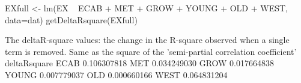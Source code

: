 \begin{Schunk}
\begin{Sinput}
 EXfull <- lm(EX ~ ECAB + MET + GROW + YOUNG + OLD + WEST, data=dat)
 getDeltaRsquare(EXfull)
\end{Sinput}
\begin{Soutput}
The deltaR-square values: the change in the R-square
      observed when a single term is removed.
Same as the square of the 'semi-partial correlation coefficient'
      deltaRsquare
ECAB   0.106307818
MET    0.034249030
GROW   0.017664838
YOUNG  0.007779037
OLD    0.000660166
WEST   0.064831204
\end{Soutput}
\end{Schunk}
